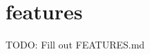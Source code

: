 \chapter{features }
\hypertarget{md__docs_2_ide_2features}{}\label{md__docs_2_ide_2features}
TODO\+: Fill out FEATURES.\+md 